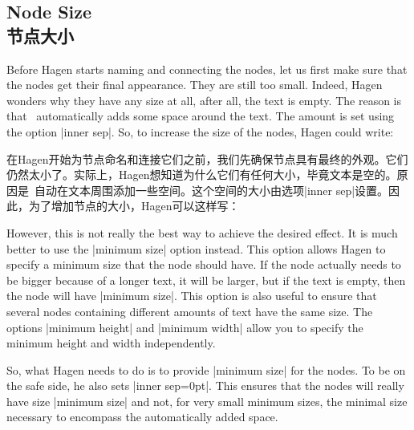 \subsection{Node Size\\节点大小}

Before Hagen starts naming and connecting the nodes, let us first make sure
that the nodes get their final appearance. They are still too small. Indeed,
Hagen wonders why they have any size at all, after all, the text is empty. The
reason is that \tikzname\ automatically adds some space around the text. The
amount is set using the option |inner sep|. So, to increase the size of the
nodes, Hagen could write:

在Hagen开始为节点命名和连接它们之前，我们先确保节点具有最终的外观。它们仍然太小了。实际上，Hagen想知道为什么它们有任何大小，毕竟文本是空的。原因是\tikzname\ 自动在文本周围添加一些空间。这个空间的大小由选项|inner sep|设置。因此，为了增加节点的大小，Hagen可以这样写：

%
\begin{codeexample}[]
\end{codeexample}

However, this is not really the best way to achieve the desired effect. It is
much better to use the |minimum size| option instead. This option allows Hagen
to specify a minimum size that the node should have. If the node actually needs
to be bigger because of a longer text, it will be larger, but if the text is
empty, then the node will have |minimum size|. This option is also useful to
ensure that several nodes containing different amounts of text have the same
size. The options |minimum height| and |minimum width| allow you to specify the
minimum height and width independently.

So, what Hagen needs to do is to provide |minimum size| for the nodes. To be on
the safe side, he also sets |inner sep=0pt|. This ensures that the nodes will
really have size |minimum size| and not, for very small minimum sizes, the
minimal size necessary to encompass the automatically added space.
%
\begin{codeexample}[]
\end{codeexample}


